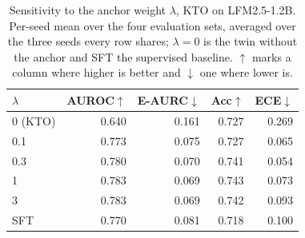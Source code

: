 \begin{table}[t]
\centering
\caption{Sensitivity to the anchor weight $\lambda$, KTO on LFM2.5-1.2B. Per-seed mean over the four evaluation sets, averaged over the three seeds every row shares; $\lambda = 0$ is the twin without the anchor and SFT the supervised baseline. $\uparrow$ marks a column where higher is better and $\downarrow$ one where lower is.}
\label{tab:lambda}
\small
\begin{tabular}{lrrrr}
\toprule
$\lambda$ & AUROC$\uparrow$ & E-AURC$\downarrow$ & Acc$\uparrow$ & ECE$\downarrow$ \\
\midrule
0 (KTO) & 0.640 & 0.161 & 0.727 & 0.269 \\
0.1 & 0.773 & 0.075 & 0.727 & 0.065 \\
0.3 & 0.780 & 0.070 & 0.741 & 0.054 \\
1 & 0.783 & 0.069 & 0.743 & 0.073 \\
3 & 0.783 & 0.069 & 0.742 & 0.093 \\
\addlinespace
SFT & 0.770 & 0.081 & 0.718 & 0.100 \\
\bottomrule
\end{tabular}
\end{table}

